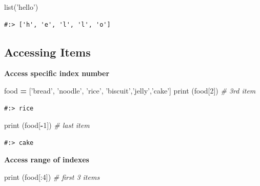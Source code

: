\documentclass[
]{book}
\newenvironment{Shaded}{\begin{snugshade}}{\end{snugshade}}
\newcommand{\BuiltInTok}[1]{#1}
\newcommand{\CommentTok}[1]{\textcolor[rgb]{0.37,0.37,0.37}{\textit{#1}}}
\newcommand{\DecValTok}[1]{\textcolor[rgb]{0.06,0.06,0.06}{#1}}
\newcommand{\NormalTok}[1]{#1}
\newcommand{\OperatorTok}[1]{\textcolor[rgb]{0.43,0.43,0.43}{\textbf{#1}}}
\newcommand{\StringTok}[1]{\textcolor[rgb]{0.5,0.5,0.5}{#1}}
\begin{document}
\begin{Shaded}
\begin{Highlighting}[]
\BuiltInTok{list}\NormalTok{(}\StringTok{'hello'}\NormalTok{)}
\end{Highlighting}
\end{Shaded}

\begin{verbatim}
#:> ['h', 'e', 'l', 'l', 'o']
\end{verbatim}

\hypertarget{accessing-items}{%
\subsection{Accessing Items}\label{accessing-items}}

\textbf{Access specific index number}

\begin{Shaded}
\begin{Highlighting}[]
\NormalTok{food }\OperatorTok{=}\NormalTok{ [}\StringTok{'bread'}\NormalTok{, }\StringTok{'noodle'}\NormalTok{, }\StringTok{'rice'}\NormalTok{, }\StringTok{'biscuit'}\NormalTok{,}\StringTok{'jelly'}\NormalTok{,}\StringTok{'cake'}\NormalTok{]}
\BuiltInTok{print}\NormalTok{ (food[}\DecValTok{2}\NormalTok{])  }\CommentTok{# 3rd item}
\end{Highlighting}
\end{Shaded}

\begin{verbatim}
#:> rice
\end{verbatim}

\begin{Shaded}
\begin{Highlighting}[]
\BuiltInTok{print}\NormalTok{ (food[}\OperatorTok{-}\DecValTok{1}\NormalTok{]) }\CommentTok{# last item}
\end{Highlighting}
\end{Shaded}

\begin{verbatim}
#:> cake
\end{verbatim}

\textbf{Access range of indexes}

\begin{Shaded}
\begin{Highlighting}[]
\BuiltInTok{print}\NormalTok{ (food[:}\DecValTok{4}\NormalTok{])     }\CommentTok{# first 3 items}
\end{Highlighting}
\end{Shaded}
\end{document}
